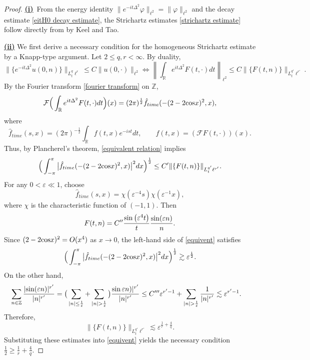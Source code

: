 \documentclass[reqno, 11pt]{amsart}
\newcommand\R{\mathbb{R}}
\newcommand\Z{\mathbb{Z}}
\newcommand\mcaF{\mathcal{F}}
\numberwithin{equation}{section}
\begin{document}
\begin{proof}
\underline{\textbf{(i)}}~From the energy identity $\|e^{-it\Delta^2}\varphi\|_{\ell^2}=\|\varphi\|_{\ell^2}$ and the decay estimate \eqref{eitH0 decay estimate}, the Strichartz estimates \eqref{strichartz estimate} follow directly from \cite[Theorem 1.2]{KT98} by Keel and Tao.

\underline{\textbf{(ii)}} We first derive a necessary condition for the homogeneous Strichartz estimate by a Knapp-type argument. Let $2\leq q,r<\infty$. By duality,
\begin{equation}\label{equivalent relation}
\|\{e^{-it\Delta^2}u(0,n)\}\|_{L^{q}_{t}\ell^{r}}\leq C\|u(0,\cdot)\|_{\ell^2}\Longleftrightarrow\left\|\int_{\R}^{}e^{it\Delta^2}F(t,\cdot)dt\right\|_{\ell^2}\leq C\|\{F(t,n)\}\|_{L^{q'}_{t}\ell^{r'}}.
\end{equation}
By the Fourier transform \eqref{fourier transform} on $\Z$, 
$$\mcaF\Big(\int_{\R}^{}e^{it\Delta^2}F(t,\cdot)dt\Big)(x)=(2\pi)^{\frac{1}{2}}\hat{f}_{time}(-(2-2{\rm cos}x)^2,x),$$
where $$\hat{f}_{time}(s,x)=(2\pi)^{-\frac{1}{2}}\int_{\R}^{}f(t,x)e^{-ist}dt,\qquad f(t,x)=(\mcaF F(t,\cdot))(x).$$
Thus, by Plancherel's theorem, \eqref{equivalent relation} implies
\begin{equation}\label{equivent}
\Big(\int_{-\pi}^{\pi}\big|\hat{f}_{time}(-(2-2{\rm cos}x)^2,x)\big|^2dx\Big)^{\frac{1}{2}}\leq C'\|\{F(t,n)\}\|_{L^{q'}_{t}\ell^{r'}}.
\end{equation}
For any $0<\varepsilon\ll1$, choose
$$\hat{f}_{time}(s,x)=\chi(\varepsilon^{-4}s)\chi(\varepsilon^{-1}x),$$
where $\chi$ is the characteristic function of $(-1,1)$. Then
$$F(t,n)=C''\frac{{\rm sin}\left(\varepsilon^{4}t\right)}{t}\frac{{\rm sin}(\varepsilon n)}{n}.$$
Since $(2-2{\rm cos}x)^2=O(x^4)$ as $  x\rightarrow0$, the left-hand side of \eqref{equivent} satisfies
$$\Big(\int_{-\pi}^{\pi}\big|\hat{f}_{time}(-(2-2{\rm cos}x)^2,x)\big|^2dx\Big)^{\frac{1}{2}}\gtrsim\varepsilon^{\frac{1}{2}}.$$
On the other hand,
\begin{align*}
\sum\limits_{n\in\Z}^{}\frac{|{\rm sin}(\varepsilon n)|^{r'}}{|n|^{r'}}&=\big(\sum\limits_{|n|\leq\frac{1}{\varepsilon}}^{}+\sum\limits_{|n|>\frac{1}{\varepsilon}}^{}\big)\frac{\sin\varepsilon n)|^{r'}}{|n|^{r'}}\leq C'''\varepsilon^{r'-1}+\sum\limits_{|n|>\frac{1}{\varepsilon}}^{}\frac{1}{|n|^{r'}}\lesssim \varepsilon^{r'-1}.
\end{align*}
Therefore, $$\|\{F(t,n)\}\|_{L^{q'}_{t}\ell^{r'}}\lesssim\varepsilon^{\frac{1}{r}+\frac{4}{q}}.$$
Substituting these estimates into \eqref{equivent} yields the necessary condition $\frac{1}{2}\geq\frac{1}{r}+\frac{4}{q}$.


\end{proof}
\end{document}
